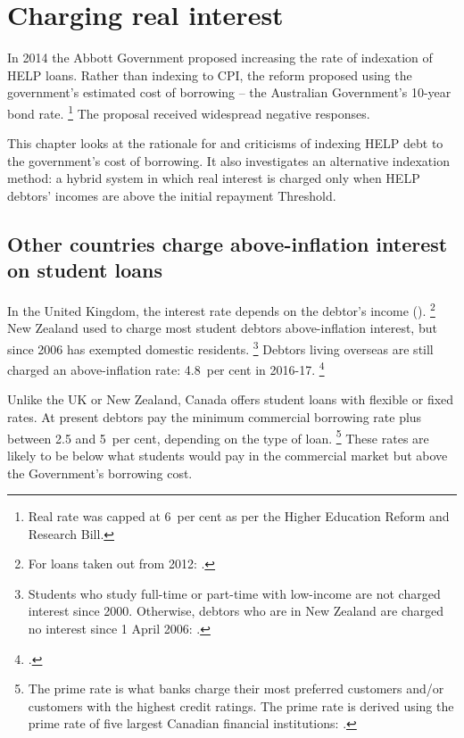\documentclass[embargoed]{grattan}
\begin{document}
\chapter{Charging real interest}\label{chap:5-charging-real-interest}

In 2014 the Abbott Government proposed increasing the rate of indexation of \gls{HELP} loans.
Rather than indexing to \gls{CPI}, the reform proposed using the government's estimated cost of borrowing -- the Australian Government's 10-year bond rate.%
\footnote{Real rate was capped at 6~per cent as per the Higher Education Reform and Research Bill.} 
The proposal received widespread negative responses.

This chapter looks at the rationale for and criticisms of indexing \gls{HELP} debt to the government's cost of borrowing.
It also investigates an alternative indexation method: a hybrid system in which real interest is charged only when \gls{HELP} debtors' incomes are above the initial repayment \gls{Threshold}.

\section{Other countries charge above-inflation interest on student loans}\label{other-countries-charge-above-inflation-interest-on-student-loans}

In the United Kingdom, the interest rate depends on the debtor's income ().%
\footnote{For loans taken out from 2012: \textcite{Company2015Changesinterestrates}.}
New Zealand used to charge most student debtors above-inflation interest, but since 2006 has exempted domestic residents.%
\footnote{Students who study full-time or part-time with low-income are not charged interest since 2000.
Otherwise, debtors who are in New Zealand are charged no interest since 1 April 2006: \textcite[][50]{EducationNZ2015Studentloanscheme}.} 
Debtors living overseas are still charged an above-inflation rate: 4.8~per cent in 2016-17.%
\footcite{InlandRevenue2016Interestothercharges}

Unlike the UK or New Zealand, Canada offers student loans with flexible or fixed rates.
At present debtors pay the minimum commercial borrowing rate plus between 2.5 and 5~per cent, depending on the type of loan.%
\footnote{The prime rate is what banks charge their most preferred customers and/or customers with the highest credit ratings.
The prime rate is derived using the prime rate of five largest Canadian financial institutions: \textcites{Canada2016InterestratesCanada}{Canada2016LoanRepaymentEstimator}.} 
These rates are likely to be below what students would pay in the commercial market but above the Government's borrowing cost.
\end{document}
